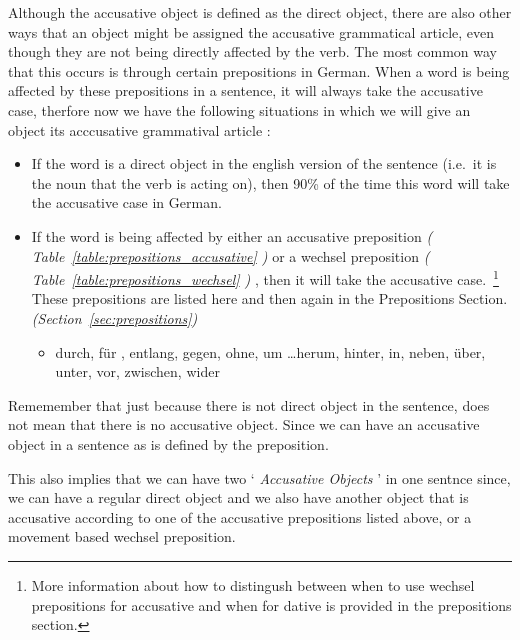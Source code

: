 \documentclass[a4paper,twocolumn,10pt]{article}
\newcommand{\newpar}
{\par \vspace{0.3cm}}
\begin{document}
Although the accusative object is defined as the direct object, there are also
other ways that an object might be assigned the accusative grammatical article,
even though they are not being directly affected by the verb. The most common
way that this occurs is through certain prepositions in German. When a word is
being affected by these prepositions in a sentence, it will always take the
accusative case, therfore now we have the following situations in which we will
give an object its acccusative grammatival article :\newpar

\nolinenumbers
\begin{itemize}[noitemsep]

	\item If the word is a direct object in the english version of the sentence
		(i.e.\ it is the noun that the verb is acting on), then 90\% of the time
		this word will take the accusative case in German.

	\item If the word is being affected by either an accusative preposition
		\textit{( Table~\ref{table:prepositions_accusative} )} or a wechsel
		preposition \textit{( Table~\ref{table:prepositions_wechsel} )} , then
		it will take the accusative case.~\footnote{More information about how
			to distingush between when to use wechsel prepositions for
			accusative and when for dative is provided in the prepositions
			section.} These prepositions are listed here and then again in the
		Prepositions Section. \textit{(Section~\ref{sec:prepositions})}
	

	\begin{itemize}[noitemsep]

		\item durch, für , entlang, gegen, ohne, um \ldots herum, hinter, in,
			neben, über, unter, vor, zwischen, wider

	\end{itemize}

\end{itemize}
\linenumbers

Rememember that just because there is not direct object in the sentence, does
not mean that there is no accusative object. Since we can have an accusative
object in a sentence as is defined by the preposition.\newpar

This also implies that we can have two ` \textit{Accusative Objects} ' in one
sentnce since, we can have a regular direct object and we also have another
object that is accusative according to one of the accusative prepositions listed
above, or a movement based wechsel preposition.\newpar
\end{document}
